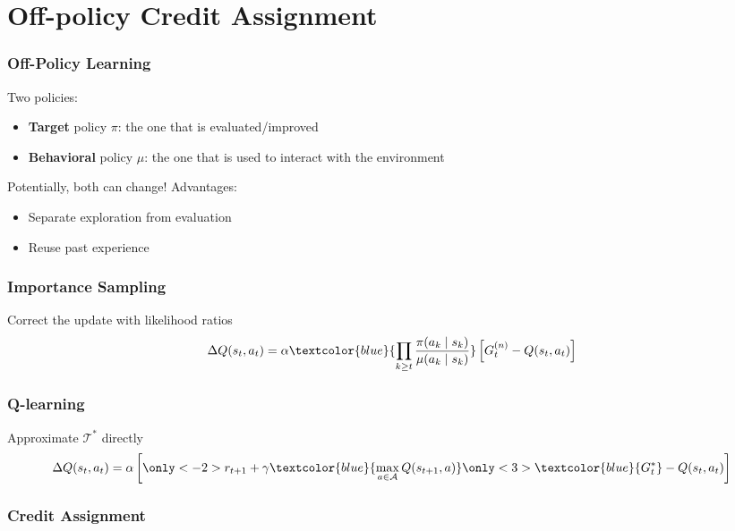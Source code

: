 \documentclass{beamer}
\begin{document}

\section{Off-policy Credit Assignment}
\frame{\tableofcontents[currentsection]}

\begin{frame}
\frametitle{Off-Policy Learning}
Two policies:
\begin{itemize}
\item \textbf{Target} policy $\pi$: the one that is evaluated/improved
\item \textbf{Behavioral} policy $\mu$: the one that is 
used to interact with the environment
\end{itemize}
Potentially, both can change!
\vfill
Advantages: 
\begin{itemize}
\item Separate exploration from evaluation
\item Reuse past experience
\end{itemize}
\end{frame}

\begin{frame}
\frametitle{Importance Sampling}
Correct the update with likelihood ratios
\[
	\Delta Q(s_t,a_t) = \alpha
	\textcolor{blue}{\prod_{k\geq t}\frac{\pi(a_k\mid s_k)}{\mu(a_k\mid s_k)}}
	\left[G_t^{(n)} - Q(s_t,a_t)\right]
\]
\vfill
{}
\end{frame}

\begin{frame}
\frametitle{Q-learning}
Approximate $\mathcal{T}^*$ directly
\[
	\Delta Q(s_t,a_t) = \alpha
	\left[ 
	\only<-2>{
	r_{t+1} +\gamma\textcolor{blue}{\max_{a\in\mathcal{A}}Q(s_{t+1},a)}
	}\only<3>{\textcolor{blue}{G_t^*}}
	 - Q(s_t,a_t)\right]
\]
\end{frame}

\begin{frame}
\frametitle{Credit Assignment}

\end{frame}
\end{document}
